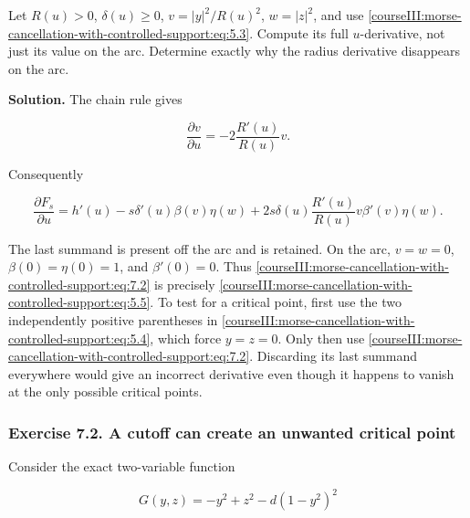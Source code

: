 \label{courseIII:morse-cancel:7.1}

Let \(R(u)>0\), \(\delta(u)\geq0\), \(v=|y|^2/R(u)^2\), \(w=|z|^2\), and use \eqref{courseIII:morse-cancellation-with-controlled-support:eq:5.3}. Compute its full \(u\)-derivative, not just its value on the arc. Determine exactly why the radius derivative disappears on the arc.

\textbf{Solution.} The chain rule gives

\begin{equation}
\frac{\partial v}{\partial u}
=-2\frac{R'(u)}{R(u)}v.
\label{courseIII:morse-cancellation-with-controlled-support:eq:7.1}
\end{equation}

Consequently

\begin{equation}
\frac{\partial F_s}{\partial u}
=h'(u)-s\delta'(u)\beta(v)\eta(w)
+2s\delta(u)\frac{R'(u)}{R(u)}v\beta'(v)\eta(w).
\label{courseIII:morse-cancellation-with-controlled-support:eq:7.2}
\end{equation}

The last summand is present off the arc and is retained. On the arc, \(v=w=0\), \(\beta(0)=\eta(0)=1\), and \(\beta'(0)=0\). Thus \eqref{courseIII:morse-cancellation-with-controlled-support:eq:7.2} is precisely \eqref{courseIII:morse-cancellation-with-controlled-support:eq:5.5}. To test for a critical point, first use the two independently positive parentheses in \eqref{courseIII:morse-cancellation-with-controlled-support:eq:5.4}, which force \(y=z=0\). Only then use \eqref{courseIII:morse-cancellation-with-controlled-support:eq:7.2}. Discarding its last summand everywhere would give an incorrect derivative even though it happens to vanish at the only possible critical points.

\subsubsection{Exercise 7.2. A cutoff can create an unwanted critical point}
\label{courseIII:morse-cancellation-with-controlled-support:exercise-7.2}

\label{courseIII:morse-cancel:7.2}

Consider the exact two-variable function

\begin{equation}
G(y,z)=-y^2+z^2-d(1-y^2)^2
\label{courseIII:morse-cancellation-with-controlled-support:eq:7.3}
\end{equation}

